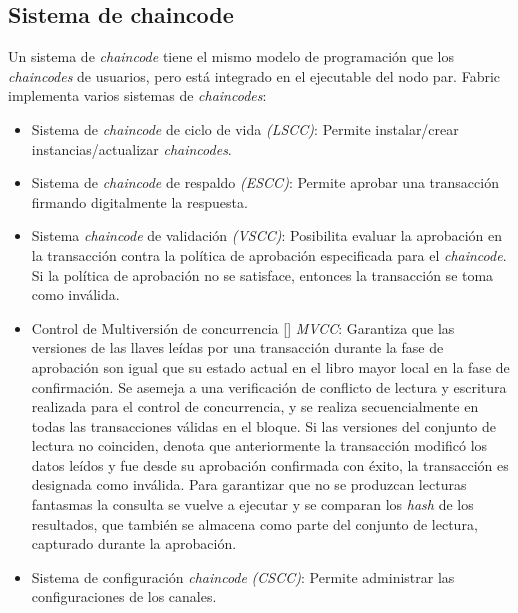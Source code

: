 \subsection{Sistema de chaincode}
Un sistema de \emph{chaincode} tiene el mismo modelo de programaci\'on que los \emph{chaincodes} de usuarios, pero est\'a integrado en el ejecutable del nodo par. Fabric implementa varios sistemas de \emph{chaincodes}:
\begin{itemize}
\item Sistema de \emph{chaincode} de ciclo de vida \emph{(LSCC)}: Permite instalar/crear instancias/actualizar \emph{chaincodes}.

\item Sistema de \emph{chaincode} de respaldo \emph{(ESCC)}: Permite aprobar una transacci\'on firmando digitalmente la respuesta.

\item Sistema \emph{chaincode} de validaci\'on \emph{(VSCC)}: Posibilita evaluar la aprobaci\'on en la transacci\'on contra la pol\'itica de aprobaci\'on especificada para el \emph{chaincode}. Si la pol\'itica de aprobaci\'on no se satisface, entonces la transacci\'on se toma como inv\'alida.

\item Control de Multiversi\'on de concurrencia [\cite{papadimitriou1984concurrency}] \emph{MVCC}: Garantiza que las versiones de las llaves le\'idas por una transacci\'on durante la fase de aprobaci\'on son igual que su estado actual en el libro mayor local en la fase de confirmaci\'on. Se asemeja a una verificaci\'on de conflicto de lectura y escritura realizada para el control de concurrencia, y se realiza secuencialmente en todas las transacciones v\'alidas en el bloque. Si las versiones del conjunto de lectura no coinciden, denota que anteriormente la transacci\'on modific\'o los datos le\'idos y fue desde su aprobaci\'on confirmada con \'exito, la transacci\'on es designada como inv\'alida. Para garantizar que no se produzcan lecturas fantasmas la consulta se vuelve a ejecutar y se comparan los \emph{hash} de los resultados, que tambi\'en se almacena como parte del conjunto de lectura, capturado durante la aprobaci\'on.

\item Sistema de configuraci\'on \emph{chaincode} \emph{(CSCC)}: Permite administrar las configuraciones de los canales.
\end{itemize}

